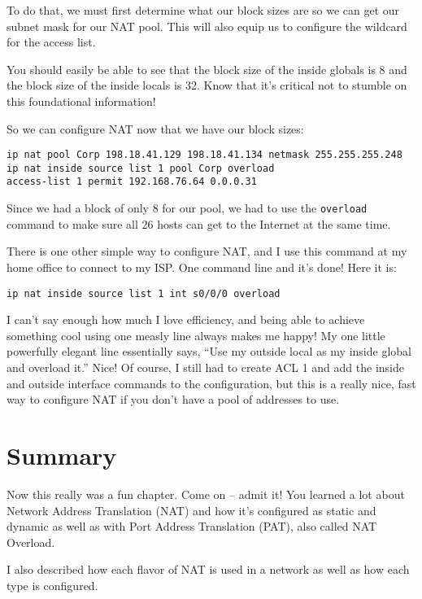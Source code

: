 To do that, we must first determine what our block sizes are so we can
get our subnet mask for our NAT pool. This will also equip us to
configure the wildcard for the access list.

You should easily be able to see that the block size of the inside
globals is 8 and the block size of the inside locals is 32. Know that
it's critical not to stumble on this foundational information!

So we can configure NAT now that we have our block sizes:

\begin{verbatim}
ip nat pool Corp 198.18.41.129 198.18.41.134 netmask 255.255.255.248
ip nat inside source list 1 pool Corp overload
access-list 1 permit 192.168.76.64 0.0.0.31
\end{verbatim}

Since we had a block of only 8 for our pool, we had to use the
\texttt{overload} command to make sure all 26 hosts can get to the
Internet at the same time.

There is one other simple way to configure NAT, and I use this command
at my home office to connect to my ISP. One command line and it's done!
Here it is:

\begin{verbatim}
ip nat inside source list 1 int s0/0/0 overload
\end{verbatim}

I can't say enough how much I love efficiency, and being able to achieve
something cool using one measly line always makes me happy! My one
little powerfully elegant line essentially says, ``Use my outside local
as my inside global and overload it.'' Nice! Of course, I still had to
create ACL 1 and add the inside and outside interface commands to the
configuration, but this is a really nice, fast way to configure NAT if
you don't have a pool of addresses to use.



\section{Summary}

Now this really was a fun chapter. Come on -- admit it! You learned a lot
about Network Address Translation (NAT) and how it's configured as
static and dynamic as well as with Port Address Translation (PAT), also
called NAT Overload.

I also described how each flavor of NAT is used in a network as well as
how each type is configured.

